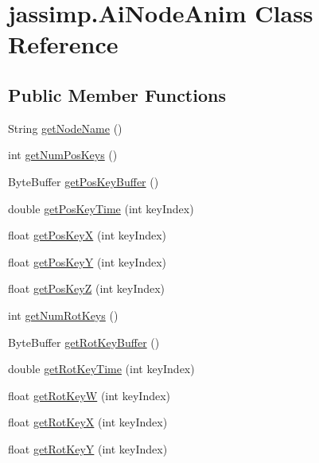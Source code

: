 \hypertarget{classjassimp_1_1_ai_node_anim}{\section{jassimp.\+Ai\+Node\+Anim Class Reference}
\label{classjassimp_1_1_ai_node_anim}
}
\subsection*{Public Member Functions}
\begin{DoxyCompactItemize}
\item 
String \hyperlink{classjassimp_1_1_ai_node_anim_aeaccb17ada9f55009732a47292f3ae27}{get\+Node\+Name} ()
\item 
int \hyperlink{classjassimp_1_1_ai_node_anim_afa3cf515c80ded051b15ab883389ce89}{get\+Num\+Pos\+Keys} ()
\item 
Byte\+Buffer \hyperlink{classjassimp_1_1_ai_node_anim_a98b5dcd779474642b5c2c05957385800}{get\+Pos\+Key\+Buffer} ()
\item 
double \hyperlink{classjassimp_1_1_ai_node_anim_a5e3886b30bfad41e44e434868cbdfc1e}{get\+Pos\+Key\+Time} (int key\+Index)
\item 
float \hyperlink{classjassimp_1_1_ai_node_anim_a2248aa7601d85597c5d43ae3b2606cc4}{get\+Pos\+Key\+X} (int key\+Index)
\item 
float \hyperlink{classjassimp_1_1_ai_node_anim_a16e3b3800ae726c9c665129c60162515}{get\+Pos\+Key\+Y} (int key\+Index)
\item 
float \hyperlink{classjassimp_1_1_ai_node_anim_a992c8313c554ac1dda010d8d9238f838}{get\+Pos\+Key\+Z} (int key\+Index)
\item 
int \hyperlink{classjassimp_1_1_ai_node_anim_a1085608769f64a3e578d46cb58abc7c7}{get\+Num\+Rot\+Keys} ()
\item 
Byte\+Buffer \hyperlink{classjassimp_1_1_ai_node_anim_ad8ec4c250a8b2668144eee7f267bde3b}{get\+Rot\+Key\+Buffer} ()
\item 
double \hyperlink{classjassimp_1_1_ai_node_anim_a8a71130337227796b673a8e59c6ae1aa}{get\+Rot\+Key\+Time} (int key\+Index)
\item 
float \hyperlink{classjassimp_1_1_ai_node_anim_adfbf40b3a772debc0d2dc10624e9974c}{get\+Rot\+Key\+W} (int key\+Index)
\item 
float \hyperlink{classjassimp_1_1_ai_node_anim_ac23c1e5d134effb11be335e2eb3c31fc}{get\+Rot\+Key\+X} (int key\+Index)
\item 
float \hyperlink{classjassimp_1_1_ai_node_anim_a683b808fc513a77e9399c84ea5f7e783}{get\+Rot\+Key\+Y} (int key\+Index)

\end{DoxyCompactItemize}
